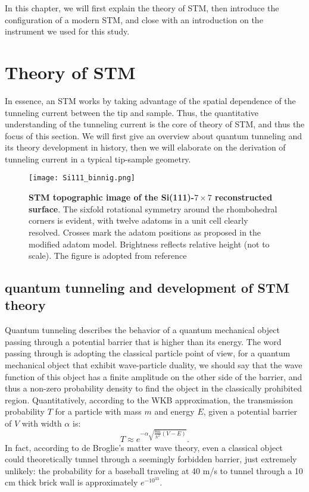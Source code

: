 In this chapter, we will first explain the theory of \ac{STM}, then introduce the configuration of a modern \ac{STM}, and close with an introduction on the instrument we used for this study. 


\section{Theory of STM}
In essence, an \ac{STM} works by taking advantage of the spatial dependence of the tunneling current between the tip and sample. Thus, the quantitative understanding of the tunneling current is the core of theory of \ac{STM}, and thus the focus of this section. We will first give an overview about quantum tunneling and its theory development in history, then we will elaborate on the derivation of tunneling current in a typical tip-sample geometry.

\begin{figure}
	\centering
	\texttt{[image: Si111\_binnig.png]}
	\caption[\textbf{STM topographic image of the Si(111)-$7 \times 7$ reconstructed surface}]{\textbf{STM topographic image of the Si(111)-$7 \times 7$ reconstructed surface}. The sixfold rotational symmetry around the rhombohedral corners is evident, with twelve adatoms in a unit cell clearly resolved. Crosses mark the adatom positions as proposed in the modified adatom model. Brightness reflects relative height (not to scale). The figure is adopted from reference \cite{binnig77Reconstruction1983}}
	\label{figure:si111_binnig}
\end{figure}

\subsection{quantum tunneling and development of STM theory}
Quantum tunneling describes the behavior of a quantum mechanical object passing through a potential barrier that is higher than its energy. The word passing through is adopting the classical particle point of view, for a quantum mechanical object that exhibit wave-particle duality, we should say that the wave function of this object has a finite amplitude on the other side of the barrier, and thus a non-zero probability density to find the object in the classically prohibited region. Quantitatively, according to the WKB approximation, the transmission probability $T$ for a particle with mass $m$ and energy $E$, given a potential barrier of $V$ with width $\alpha$ is: 
\begin{equation}
	T \approx e^{-\alpha\sqrt{\frac{8m}{\hslash^2}(V-E)}}. 
\end{equation}
In fact, according to de Broglie's  matter wave theory, even a classical object could theoretically tunnel through a seemingly forbidden barrier, just extremely unlikely: the probability for a baseball traveling at 40 m/s to tunnel through a 10 cm thick brick wall is approximately $e^{-10^{33}}$. 

